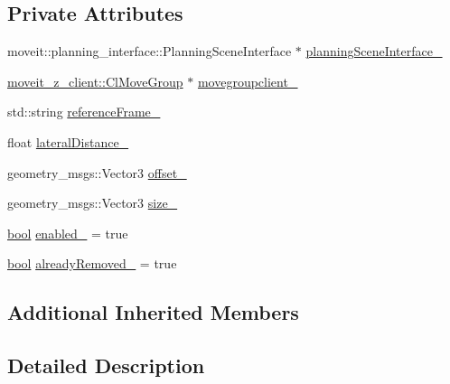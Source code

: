\subsection*{Private Attributes}
\begin{DoxyCompactItemize}
\item 
moveit\+::planning\+\_\+interface\+::\+Planning\+Scene\+Interface $\ast$ \hyperlink{classsm__moveit__4_1_1cl__moveit__z__client_1_1CpConstraintLateralWorkspace_a39ac03e23023aef4e90f6bdd2ea41f75}{planning\+Scene\+Interface\+\_\+}
\item 
\hyperlink{classmoveit__z__client_1_1ClMoveGroup}{moveit\+\_\+z\+\_\+client\+::\+Cl\+Move\+Group} $\ast$ \hyperlink{classsm__moveit__4_1_1cl__moveit__z__client_1_1CpConstraintLateralWorkspace_ac8161c83393d63fbf382856ac1aacb93}{movegroupclient\+\_\+}
\item 
std\+::string \hyperlink{classsm__moveit__4_1_1cl__moveit__z__client_1_1CpConstraintLateralWorkspace_a69be978ebfd12ba0ada5d4ccf4333a06}{reference\+Frame\+\_\+}
\item 
float \hyperlink{classsm__moveit__4_1_1cl__moveit__z__client_1_1CpConstraintLateralWorkspace_afe12f95ff8a79564f4f7d944b2c3cf1d}{lateral\+Distance\+\_\+}
\item 
geometry\+\_\+msgs\+::\+Vector3 \hyperlink{classsm__moveit__4_1_1cl__moveit__z__client_1_1CpConstraintLateralWorkspace_a511cfdaa29f05d8b81a3c53b7241c51e}{offset\+\_\+}
\item 
geometry\+\_\+msgs\+::\+Vector3 \hyperlink{classsm__moveit__4_1_1cl__moveit__z__client_1_1CpConstraintLateralWorkspace_a35fb6ec0933eff1c2e4a7930b9815fcb}{size\+\_\+}
\item 
\hyperlink{classbool}{bool} \hyperlink{classsm__moveit__4_1_1cl__moveit__z__client_1_1CpConstraintLateralWorkspace_a869220e440aadc79cf5213b6d27c1217}{enabled\+\_\+} = true
\item 
\hyperlink{classbool}{bool} \hyperlink{classsm__moveit__4_1_1cl__moveit__z__client_1_1CpConstraintLateralWorkspace_a9d195448b13cc11a2043197ee4885e05}{already\+Removed\+\_\+} = true
\end{DoxyCompactItemize}
\subsection*{Additional Inherited Members}


\subsection{Detailed Description}


